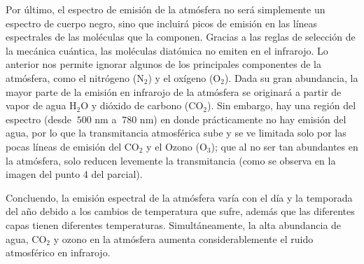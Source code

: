 \documentclass[notitlepage,letterpaper,12pt]{article} %
\begin{document}
Por último, el espectro de emisión de la atmósfera no será simplemente un espectro de cuerpo negro, sino que incluirá picos de emisión en las líneas espectrales de las moléculas que la componen.
Gracias a las reglas de selección de la mecánica cuántica, las moléculas diatómica no emiten en el infrarojo. Lo anterior nos permite ignorar algunos de los principales componentes de la atmósfera, como el nitrógeno (N$_2$) y el oxígeno (O$_2$).
Dada su gran abundancia, la mayor parte de la emisión en infrarojo de la atmósfera se originará a partir de vapor de agua H$_2$O y dióxido de carbono (CO$_2$).
Sin embargo, hay una región del espectro (desde $~500$ nm a $~780$ nm) en donde prácticamente no hay emisión del agua, por lo que la transmitancia atmosférica sube y se ve limitada solo por las pocas líneas de emisión del CO$_2$ y el Ozono (O$_3$); que al no ser tan abundantes en la atmósfera, solo reducen levemente la transmitancia (como se observa en la imagen del punto 4 del parcial).

Concluendo, la emisión espectral de la atmósfera varía con el día y la temporada del año debido a los cambios de temperatura que sufre, además que las diferentes capas tienen diferentes temperaturas. Simultáneamente, la alta abundancia de agua, CO$_2$ y ozono en la atmósfera aumenta considerablemente el ruido atmosférico en infrarojo.





\end{document}
